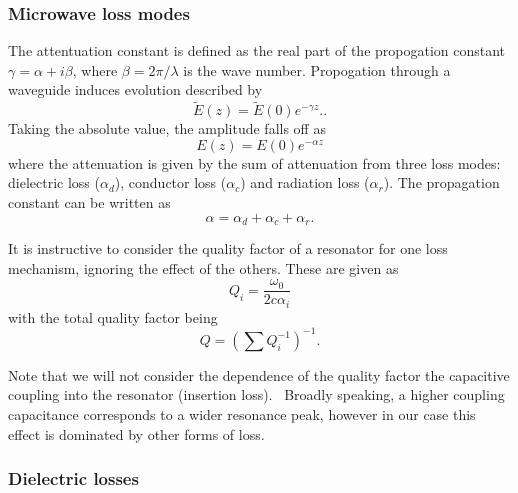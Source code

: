\subsubsection{Microwave loss modes}


The attentuation constant is defined as the real part of the propogation
constant $\gamma = \alpha + i\beta$, where $\beta = 2\pi / \lambda$ is the wave
number.  Propogation through a waveguide induces evolution described by
\begin{equation}
  \widetilde{E}(z) = \widetilde{E}(0)e^{-\gamma z}.
  \label{experiment:mw:eqn:Eloss}.
\end{equation}
Taking the absolute value, the amplitude falls off as
\begin{equation}
  E(z) = E(0)e^{-\alpha z}
\end{equation}
where the attenuation is given by the sum of attenuation from three loss modes:
dielectric loss ($\alpha_d$), conductor loss ($\alpha_c$) and radiation loss
($\alpha_r$). The propagation constant can be written as
\begin{equation}
  \alpha = \alpha_d + \alpha_c + \alpha_r.
\end{equation}

It is instructive to consider the quality factor of a resonator for one loss
mechanism, ignoring the effect of the others. These are given as
\begin{equation}
  Q_i = \frac{\omega_0}{2c\alpha_i}
\end{equation}
with the total quality factor being
\begin{equation}
  Q = \left(\sum Q_i^{-1} \right)^{-1}.
\end{equation}

Note that we will not consider the dependence of the quality factor the
capacitive coupling into the resonator (insertion loss).~\cite{Simons2004,
doi:10.1063/1.3010859} Broadly speaking, a higher coupling capacitance
corresponds to a wider resonance peak, however in our case this effect is
dominated by other forms of loss.

\subsubsection*{Dielectric losses}

